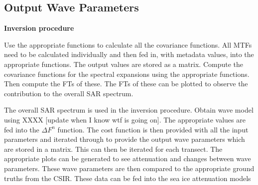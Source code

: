 \subsection{Output Wave Parameters} \label{subsec:systemDesign.inversion.outputWaveParams}



\textbf{Inversion procedure}

Use the appropriate functions to calculate all the covariance functions. All MTFs need to be calculated individually and then fed in, with metadata values, into the appropriate functions. The output values are stored as a matrix. Compute the covariance functions for the spectral expansions using the appropriate functions. Then compute the FTs of these. The FTs of these can be plotted to observe the contribution to the overall SAR spectrum. 

The overall SAR spectrum is used in the inversion procedure. Obtain wave model using XXXX [update when I know wtf is going on]. The appropriate values are fed into the $\Delta F^n$ function. The cost function is then provided with all the input parameters and iterated through to provide the output wave parameters which are stored in a matrix. This can then be iterated for each transect. The appropriate plots can be generated to see attenuation and changes between wave parameters. These wave parameters are then compared to the appropriate ground truths from the CSIR. These data can be fed into the sea ice attenuation models 





